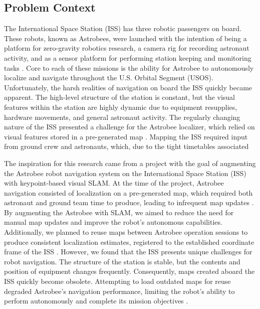 \subsection{Problem Context}


The International Space Station (ISS) has three robotic passengers on board. These robots, known as Astrobees, were launched with the intention of being a platform for zero-gravity robotics research, a camera rig for recording astronaut activity, and as a sensor platform for performing station keeping and monitoring tasks \cite{smithASTROBEENEWPLATFORM}. Core to each of these missions is the ability for Astrobee to autonomously localize and navigate throughout the U.S. Orbital Segment (USOS). Unfortunately, the harsh realities of navigation on board the ISS quickly became apparent. The high-level structure of the station is constant, but the visual features within the station are highly dynamic due to equipment resupplies, hardware movements, and general astronaut activity. The regularly changing nature of the ISS presented a challenge for the Astrobee localizer, which relied on visual features stored in a pre-generated map \cite{soussanAstroLocEfficientRobust2022}. Mapping the ISS required input from ground crew and astronauts, which, due to the tight timetables associated 

The inspiration for this research came from a project with the goal of augmenting the Astrobee robot navigation system on the International Space Station (ISS) with keypoint-based visual SLAM. At the time of the project, Astrobee navigation consisted of localization on a pre-generated map, which required both astronaut and ground team time to produce, leading to infrequent map updates \cite{soussanAstroLocEfficientRobust2022}. By augmenting the Astrobee with SLAM, we aimed to reduce the need for manual map updates and improve the robot's autonomous capabilities. Additionally, we planned to reuse maps between Astrobee operation sessions to produce consistent localization estimates, registered to the established coordinate frame of the ISS \cite{zuralesCollaborativeSensingMapping2024}. However, we found that the ISS presents unique challenges for robot navigation. The structure of the station is stable, but the contents and position of equipment changes frequently. Consequently, maps created aboard the ISS quickly become obsolete. Attempting to load outdated maps for reuse degraded Astrobee's navigation performance, limiting the robot's ability to perform autonomously and complete its mission objectives \cite{carlinoLessonsLearnedAstrobee}.

